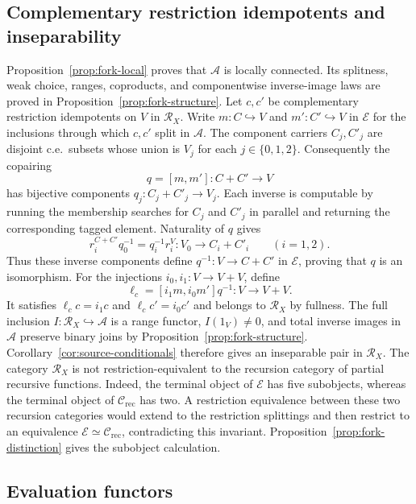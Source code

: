 \subsection{Complementary restriction idempotents and inseparability}

Proposition~\ref{prop:fork-local} proves that $\mathcal A$ is locally
connected. Its splitness, weak choice, ranges, coproducts, and
componentwise inverse-image laws are proved in
Proposition~\ref{prop:fork-structure}.
Let $c,c'$ be complementary restriction idempotents on $V$ in
$\mathscr R_X$. Write
$m:C\hookrightarrow V$ and $m':C'\hookrightarrow V$ in $\mathcal E$
for the inclusions through which $c,c'$ split in $\mathcal A$.
The component carriers $C_j,C'_j$ are disjoint c.e.\ subsets whose union
is $V_j$ for each $j\in\{0,1,2\}$. Consequently the copairing
\[
 q=[m,m']:C+C'\longrightarrow V
\]
has bijective components $q_j:C_j+C'_j\to V_j$. Each inverse is
computable by running the membership searches for $C_j$ and $C'_j$ in
parallel and returning the corresponding tagged element. Naturality of $q$
gives
\[
 r_i^{C+C'}q_0^{-1}=q_i^{-1}r_i^V:V_0\longrightarrow C_i+C'_i
 \qquad(i=1,2).
\]
Thus these inverse components define $q^{-1}:V\to C+C'$ in
$\mathcal E$, proving that $q$ is an isomorphism.
For the injections $i_0,i_1:V\to V+V$, define
\[
 \ell_c=[i_1m,i_0m']q^{-1}:V\longrightarrow V+V.
\]
It satisfies $\ell_cc=i_1c$ and $\ell_cc'=i_0c'$ and belongs to
$\mathscr R_X$ by fullness. The full inclusion
$I:\mathscr R_X\hookrightarrow\mathcal A$ is a range functor,
$I(1_V)\ne0$, and total inverse images in $\mathcal A$ preserve
binary joins by Proposition~\ref{prop:fork-structure}.
Corollary~\ref{cor:source-conditionals} therefore gives an inseparable
pair in $\mathscr R_X$.
The category $\mathscr R_X$ is not restriction-equivalent to the
recursion category of partial recursive functions. Indeed, the terminal object of
$\mathcal E$ has five subobjects, whereas the terminal object of
$\mathcal C_{\mathrm{rec}}$ has two.
A restriction equivalence between these two recursion categories
would extend to the restriction splittings and then restrict to an
equivalence $\mathcal E\simeq\mathcal C_{\mathrm{rec}}$, contradicting
this invariant. Proposition~\ref{prop:fork-distinction} gives the
subobject calculation.

\subsection{Evaluation functors}

